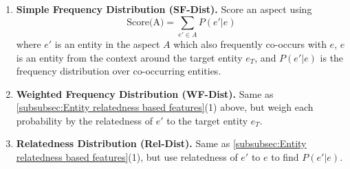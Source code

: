 \documentclass[sigconf,authordraft]{acmart}
\begin{document}
\begin{enumerate}
    \item \textbf{Simple Frequency Distribution (SF-Dist).} 
    Score an aspect using
    \begin{equation}
    \label{eq:score-aspect-using-simple-freq-dist}
        \text{Score(A)} = \sum_{e' \in A}P(e' \vert e)
    \end{equation}
    where $e'$ is an entity in the aspect $A$ which also frequently co-occurs with $e$, $e$ is an entity from the context around the target entity $e_T$, and $P( e' \vert e)$ is the frequency distribution over co-occurring entities.
    
    
    \item \textbf{Weighted Frequency Distribution (WF-Dist).} 
    Same as \ref{subsubsec:Entity relatedness based features}(1) above, but weigh each probability by the relatedness of $e'$ to the target entity $e_T$.
    

\item \textbf{Relatedness Distribution (Rel-Dist).} 
Same as \ref{subsubsec:Entity relatedness based features}(1), but use relatedness of $e'$ to $e$ to find $P( e' \vert e)$.

\end{enumerate}
\end{document}
